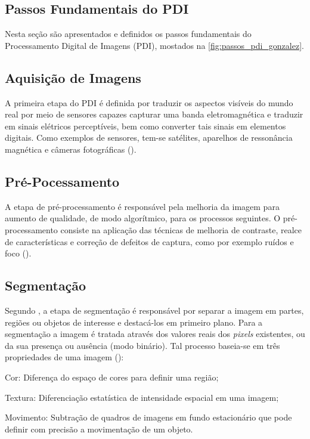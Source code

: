 \documentclass[12pt,oneside,a4paper,chapter=TITLE,section=TITLE,sumario=tradicional]{abntex2}
\begin{document}
\subsection{Passos Fundamentais do PDI}
Nesta seção são apresentados e definidos os passos fundamentais do Processamento Digital de Imagens (PDI), mostados na \autoref{fig:passos_pdi_gonzalez}.

\begin{figure}[htb]
\end{figure}

\subsection{Aquisição de Imagens}

A primeira etapa do PDI é definida por traduzir os aspectos visíveis do mundo real por meio de sensores capazes capturar uma banda eletromagnética e traduzir em sinais elétricos perceptíveis, bem como converter tais sinais em elementos digitais. Como exemplos de sensores, tem-se satélites, aparelhos de ressonância magnética e câmeras fotográficas ().

\subsection{Pré-Pocessamento}

A etapa de pré-processamento é responsável pela melhoria da imagem para aumento de qualidade, de modo algorítmico, para os processos seguintes. O pré-processamento consiste na aplicação das técnicas de melhoria de contraste, realce de características e correção de defeitos de captura, como por exemplo ruídos e foco ().

\subsection{Segmentação}

Segundo , a etapa de segmentação é responsável por separar a imagem em partes, regiões ou objetos de interesse e destacá-los em primeiro plano. Para a segmentação a imagem é tratada através dos valores reais dos \textit{pixels} existentes, ou da sua presença ou ausência (modo binário). Tal processo baseia-se em três propriedades de uma imagem ():
\begin{lista}
    \item Cor: Diferença do espaço de cores para definir uma região;
    \item Textura: Diferenciação estatística de intensidade espacial em uma imagem;
    \item Movimento: Subtração de quadros de imagens em fundo estacionário que pode definir com precisão a movimentação de um objeto.
\end{lista}
\end{document}
